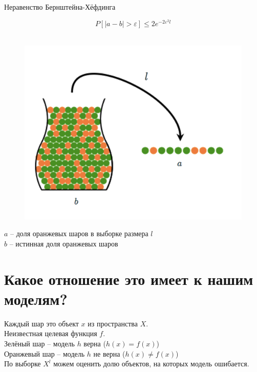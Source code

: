 \documentclass[10pt]{beamer}
\begin{document}
\begin{frame}{Неравенство Бернштейна-Хёфдинга}
  \begin{minipage}[t]{0.5\linewidth}
    $$P[\vert a - b \vert > \varepsilon ] \leq 2 e^{-2 \varepsilon^2 l} $$\\
  \end{minipage}%
  \begin{minipage}{0.45\textwidth}
    \begin{center}
      \begin{figure}
        \includegraphics[width=\textwidth, keepaspectratio]{images/bin}    
      \end{figure}
    \end{center}

  \end{minipage}%
    \bigbreak
    $a$ -- доля оранжевых шаров в выборке размера $l$\\
    $b$ -- истинная доля оранжевых шаров 
  
\end{frame}

\section{Какое отношение это имеет к нашим моделям?}

\begin{frame}
  Каждый шар это объект $x$ из пространства $X$.\\
  Неизвестная целевая функция $f$.\\
  \bigbreak
  Зелёный шар -- модель $h$ верна ($h(x) = f(x)$)\\  
  Оранжевый шар -- модель $h$ не верна ($h(x) \neq f(x)$)\\  
  \bigbreak
  По выборке $X^l$ можем оценить долю объектов, на которых модель ошибается.
\end{frame}
\end{document}
